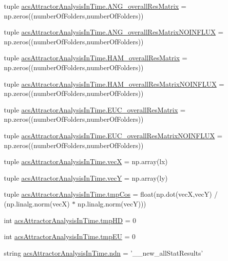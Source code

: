 \begin{DoxyCompactItemize}
\item 
tuple \hyperlink{a00125_a15adfffa273548845cea67d8b89f0bb1}{acs\+Attractor\+Analysis\+In\+Time.\+A\+N\+G\+\_\+overall\+Res\+Matrix} = np.\+zeros((number\+Of\+Folders,number\+Of\+Folders))
\item 
tuple \hyperlink{a00125_a7b0e67be0cf8de69432bdf56919d9e33}{acs\+Attractor\+Analysis\+In\+Time.\+A\+N\+G\+\_\+overall\+Res\+Matrix\+N\+O\+I\+N\+F\+L\+U\+X} = np.\+zeros((number\+Of\+Folders,number\+Of\+Folders))
\item 
tuple \hyperlink{a00125_a5e8d5d65865736555e76c3f04058ddd9}{acs\+Attractor\+Analysis\+In\+Time.\+H\+A\+M\+\_\+overall\+Res\+Matrix} = np.\+zeros((number\+Of\+Folders,number\+Of\+Folders))
\item 
tuple \hyperlink{a00125_a6ea74abf4c94200ed1b27d892ecacc97}{acs\+Attractor\+Analysis\+In\+Time.\+H\+A\+M\+\_\+overall\+Res\+Matrix\+N\+O\+I\+N\+F\+L\+U\+X} = np.\+zeros((number\+Of\+Folders,number\+Of\+Folders))
\item 
tuple \hyperlink{a00125_a63ee1925f76a40d04495e9b35c0973d2}{acs\+Attractor\+Analysis\+In\+Time.\+E\+U\+C\+\_\+overall\+Res\+Matrix} = np.\+zeros((number\+Of\+Folders,number\+Of\+Folders))
\item 
tuple \hyperlink{a00125_a4f2ecc559d2c5d79bb138a2e8ced8127}{acs\+Attractor\+Analysis\+In\+Time.\+E\+U\+C\+\_\+overall\+Res\+Matrix\+N\+O\+I\+N\+F\+L\+U\+X} = np.\+zeros((number\+Of\+Folders,number\+Of\+Folders))
\item 
tuple \hyperlink{a00125_a55e7171c96f320a08ad29f21ad5faf9a}{acs\+Attractor\+Analysis\+In\+Time.\+vec\+X} = np.\+array(lx)
\item 
tuple \hyperlink{a00125_aaa4ad55a8fe44bfc5a386dff027886b0}{acs\+Attractor\+Analysis\+In\+Time.\+vec\+Y} = np.\+array(ly)
\item 
tuple \hyperlink{a00125_a547703ec10e432928645bbe8d226dceb}{acs\+Attractor\+Analysis\+In\+Time.\+tmp\+Cos} = float(np.\+dot(vec\+X,vec\+Y) / (np.\+linalg.\+norm(vec\+X) $\ast$ np.\+linalg.\+norm(vec\+Y)))
\item 
int \hyperlink{a00125_a35b7af9eb7cd962d33c5d56eae794c7b}{acs\+Attractor\+Analysis\+In\+Time.\+tmp\+H\+D} = 0
\item 
int \hyperlink{a00125_a9019a56cfd992899ffc519204307a8ae}{acs\+Attractor\+Analysis\+In\+Time.\+tmp\+E\+U} = 0
\item 
string \hyperlink{a00125_ab0e0a55161ee1fd9fb0f086a328f67b7}{acs\+Attractor\+Analysis\+In\+Time.\+ndn} = '\+\_\+\_\+new\+\_\+all\+Stat\+Results'
\item 

\end{DoxyCompactItemize}
